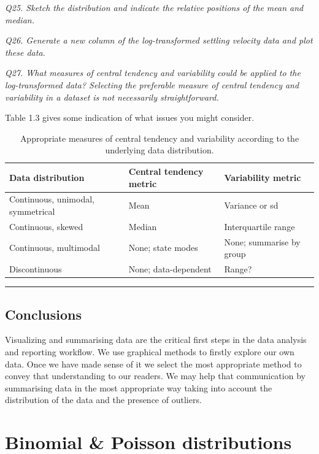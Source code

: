 \documentclass[
  11pt,
  a4paper,
]{book}
\begin{document}
\emph{Q25. Sketch the distribution and indicate the relative positions of the mean and median.}

\emph{Q26. Generate a new column of the log-transformed settling velocity data and plot these data.}

\emph{Q27. What measures of central tendency and variability could be applied to the log-transformed data? Selecting the preferable measure of central tendency and variability in a dataset is not necessarily straightforward.}

Table 1.3 gives some indication of what issues you might consider.

\begin{table}

\caption{\label{tab:metric-table}Appropriate measures of central tendency and variability according to the underlying data distribution.}
\centering
\begin{tabular}[t]{lll}
\toprule
Data distribution & Central tendency metric & Variability metric\\
\midrule
Continuous,
unimodal,
symmetrical & Mean & Variance or sd\\
Continuous, skewed & Median & Interquartile range\\
Continuous,
multimodal & None; state modes & None; summarise by
group\\
Discontinuous & None; data-dependent & Range?\\
\bottomrule
\end{tabular}
\end{table}

\begin{center}\rule{0.5\linewidth}{0.5pt}\end{center}

\hypertarget{conclusions}{%
\section{Conclusions}\label{conclusions}}

Visualizing and summarising data are the critical first steps in the data analysis and reporting workflow. We use graphical methods to firstly explore our own data. Once we have made sense of it we select the most appropriate method to convey that understanding to our readers. We may help that communication by summarising data in the most appropriate way taking into account the distribution of the data and the presence of outliers.

\hypertarget{bin_pois}{%
\chapter{Binomial \& Poisson distributions}\label{bin_pois}}
\end{document}
